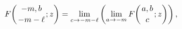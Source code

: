 \[\mathop{F\/}\nolimits\!\left({-m,b\atop-m-\ell};z\right)=\lim_{c\to-m-\ell}%
\left(\lim_{a\to-m}\mathop{F\/}\nolimits\!\left({a,b\atop c};z\right)\right),\]